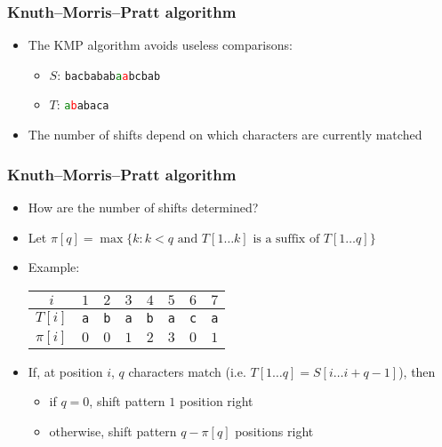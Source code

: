 \begin{frame}
    \frametitle{Knuth--Morris--Pratt algorithm}
    \begin{itemize}
    \item The KMP algorithm avoids useless comparisons:
        \begin{itemize}
            \item $S$: \texttt{bacbabab\textcolor{green}{a}\textcolor{red}{a}bcbab}
            \item $T$: \texttt{\textcolor{green}{a}\textcolor{red}{b}abaca}
        \end{itemize}
    \item<2-> The number of shifts depend on which characters are currently matched
    \end{itemize}
\end{frame}

\begin{frame}
    \frametitle{Knuth--Morris--Pratt algorithm}
    \begin{itemize}
        \item How are the number of shifts determined?
            \vspace{5pt}
        \item Let {\footnotesize $\pi[q] = \max \{ k : k < q \textrm{ and } T[1\ldots k] \textrm{ is a suffix of } T[1\ldots q] \}$}
            \vspace{5pt}
        \item<2-> Example:\\
            \begin{center}
                \begin{tabular}{cccccccc}
                    $i$ & $1$ & $2$ & $3$ & $4$ & $5$ & $6$ & $7$ \\
                    \hline
                    $T[i]$&\texttt{a}&\texttt{b}&\texttt{a}&\texttt{b}&\texttt{a}&\texttt{c}&\texttt{a} \\
                    $\pi[i]$ & $0$ & $0$ & $1$ & $2$ & $3$ & $0$ & $1$\\
                \end{tabular}
            \end{center}
    \vspace{5pt}
        \item<3-> If, at position $i$, $q$ characters match (i.e. $T[1\ldots q] = S[i\ldots i+q-1]$), then
            \begin{itemize}
                \item if $q = 0$, shift pattern $1$ position right
                \item otherwise, shift pattern $q - \pi[q]$ positions right
            \end{itemize}
    \end{itemize}
\end{frame}

